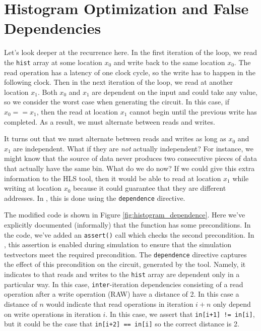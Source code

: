 \section{Histogram Optimization and False Dependencies}
Let's look deeper at the recurrence here.  In the first iteration of the loop, we read the \lstinline{hist} array at some location $x_0$ and write back to the same location $x_0$.  The read operation has a latency of one clock cycle, so the write has to happen in the following clock.  Then in the next iteration of the loop, we read at another location $x_1$.  Both $x_0$ and $x_1$ are dependent on the input and could take any value, so we consider the worst case when generating the circuit.  In this case, if $x_0 == x_1$, then the read at location $x_1$ cannot begin until the previous write has completed.  As a result, we must alternate between reads and writes.  

It turns out that we must alternate between reads and writes as long as $x_0$ and $x_1$ are independent.  What if they are {\em not} actually independent?  For instance, we might know that the source of data never produces two consecutive pieces of data that actually have the same bin.  What do we do now?  If we could give this extra information to the HLS tool, then it would be able to read at location $x_1$ while writing at location $x_0$ because it could guarantee that they are different addresses.   In \VHLS, this is done using the \lstinline|dependence| directive.

The modified code is shown in Figure \ref{fig:histogram_dependence}.  Here we've explicitly documented (informally) that the function has some preconditions.  In the code, we've added an \lstinline|assert()| call which checks the second precondition.
In \VHLS, this assertion is enabled during simulation to ensure that the simulation testvectors meet the required precondition.  The \lstinline|dependence| directive captures the effect of this precondition on the circuit, generated by the tool.  Namely, it indicates to \VHLS that reads and writes to the \lstinline|hist| array are dependent only in a particular way.  In this case, \lstinline|inter|-iteration dependencies consisting of a read operation after a write operation (RAW) have a distance of 2.  In this case a distance of $n$ would indicate that read operations in iteration $i+n$ only depend on write operations in iteration $i$.  In this case, we assert that \lstinline|in[i+1] != in[i]|, but it could be the case that \lstinline|in[i+2] == in[i]| so the correct distance is 2.

